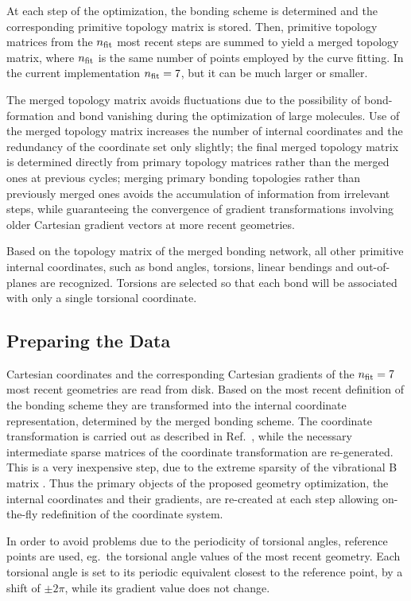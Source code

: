 \documentclass[prl,twocolumn,showpacs,twocolumngrid,superbib]{revtex4}
\begin{document}
At each step of the optimization, the  bonding scheme is determined and the corresponding 
primitive topology matrix is stored.  Then, primitive topology matrices from the 
$n_{\rm fit}$ most  recent steps are summed to yield a merged topology matrix, where 
$n_{\rm fit}$ is the same number of points employed by the curve fitting.   
In the current implementation $n_{\rm fit}=7$, but it can be much larger or smaller.  

The merged topology matrix avoids fluctuations due to the possibility of bond-formation and
bond vanishing during the optimization of large molecules.  Use of the merged topology matrix
increases the number of internal coordinates and the redundancy of the coordinate set only slightly;
the final merged topology matrix is determined directly from primary topology matrices rather
than the merged ones at previous cycles; merging  primary bonding topologies rather than previously
merged ones avoids the accumulation of information from irrelevant steps, while guaranteeing the convergence of gradient
transformations involving older Cartesian gradient vectors at more recent geometries.

Based on the topology matrix of the merged bonding network, all other primitive 
internal coordinates, such as bond angles, torsions, linear bendings and 
out-of-planes are recognized. Torsions are selected so that each bond will be 
associated with only a single torsional coordinate.

\subsection{Preparing the Data}

Cartesian coordinates and the corresponding Cartesian gradients of the $n_{\rm fit}=7$ 
most recent geometries are read from disk. Based on the most recent definition of the 
bonding scheme they are transformed into the internal coordinate representation,
determined by the merged bonding scheme.  The coordinate transformation is carried out as 
described in Ref.~, while the necessary intermediate sparse matrices of 
the coordinate transformation are re-generated. This is a very inexpensive step, due to the 
extreme sparsity of the vibrational B matrix \cite{EWilson55}. 
Thus the primary objects of the proposed geometry optimization,  the internal coordinates and their gradients,
are re-created at each step allowing on-the-fly redefinition of the 
coordinate system.

In order to avoid problems due to the periodicity of torsional angles, reference points are used, 
eg.~the torsional angle values of the most recent geometry. Each torsional angle is set to its 
periodic equivalent closest to the reference point, by a shift of $\pm 2\pi$, while its gradient value 
does not change.
\end{document}
